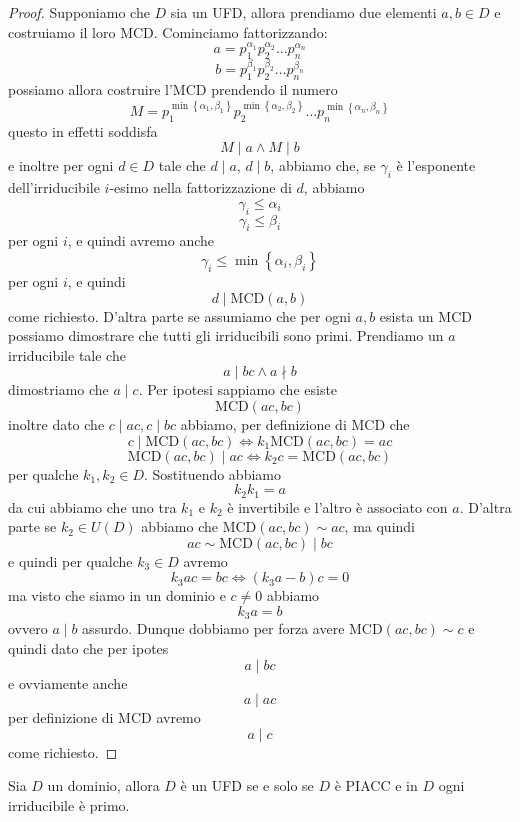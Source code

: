\documentclass[11pt]{scrartcl}
\newcommand{\MCD}{\text{MCD}}
\begin{document}
	\begin{proof}
		Supponiamo che $D$ sia un UFD, allora prendiamo due elementi $a,b\in D$ e costruiamo il loro MCD. Cominciamo fattorizzando:
		$$a=p_1^{\alpha_1}p_2^{\alpha_2}\dots p_n^{\alpha_n}$$
		$$b=p_1^{\beta_1}p_2^{\beta_2}\dots p_n^{\beta_n}$$
		possiamo allora costruire l'MCD prendendo il numero
		$$M=p_1^{\min\left\{\alpha_1,\beta_1\right\}}p_2^{\min\left\{\alpha_2,\beta_2\right\}}\dots p_n^{\min\left\{\alpha_n,\beta_n\right\}}$$
		questo in effetti soddisfa
		$$M\mid a \land M\mid b$$
		e inoltre per ogni $d\in D$ tale che $d\mid a$, $d\mid b$, abbiamo che, se $\gamma_i$ è l'esponente dell'irriducibile $i$-esimo nella fattorizzazione di $d$, abbiamo
		$$\gamma_i\le \alpha_i$$
		$$\gamma_i\le \beta_i$$
		per ogni $i$, e quindi avremo anche
		$$\gamma_i \le \min\left\{\alpha_i,\beta_i\right\}$$
		per ogni $i$, e quindi
		$$d\mid \MCD(a,b)$$
		come richiesto. D'altra parte se assumiamo che per ogni $a,b$ esista un MCD possiamo dimostrare che tutti gli irriducibili sono primi. Prendiamo un $a$ irriducibile tale che 
		$$a\mid bc \land a\nmid b$$
		dimostriamo che $a\mid c$. Per ipotesi sappiamo che esiste 
		$$\MCD(ac,bc)$$
		inoltre dato che $c\mid ac,c\mid bc$ abbiamo, per definizione di MCD che 
		$$c\mid \MCD(ac,bc) \iff k_1\MCD(ac,bc)=ac$$
		$$\MCD(ac,bc) \mid ac \iff k_2c=\MCD(ac,bc)$$
		per qualche $k_1,k_2\in D$. Sostituendo abbiamo
		$$k_2k_1=a$$
		da cui abbiamo che uno tra $k_1$ e $k_2$ è invertibile e l'altro è associato con $a$. D'altra parte se $k_2\in U(D)$ abbiamo che $\MCD(ac,bc)\sim ac$, ma quindi 
		$$ac\sim \MCD(ac,bc)\mid bc$$
		e quindi per qualche $k_3\in D$ avremo
		$$k_3ac=bc \iff (k_3a-b)c=0$$
		ma visto che siamo in un dominio e $c\ne 0$ abbiamo
		$$k_3a=b$$
		ovvero $a\mid b$ assurdo. Dunque dobbiamo per forza avere $\MCD(ac,bc)\sim c$ e quindi dato che per ipotes
		$$a\mid bc$$
		e ovviamente anche 
		$$a\mid ac$$
		per definizione di MCD avremo
		$$a\mid c$$
		come richiesto.
	\end{proof}
	\begin{theorem}
		Sia $D$ un dominio, allora $D$ è un UFD se e solo se $D$ è PIACC e in $D$ ogni irriducibile è primo.
	\end{theorem}
\end{document}
